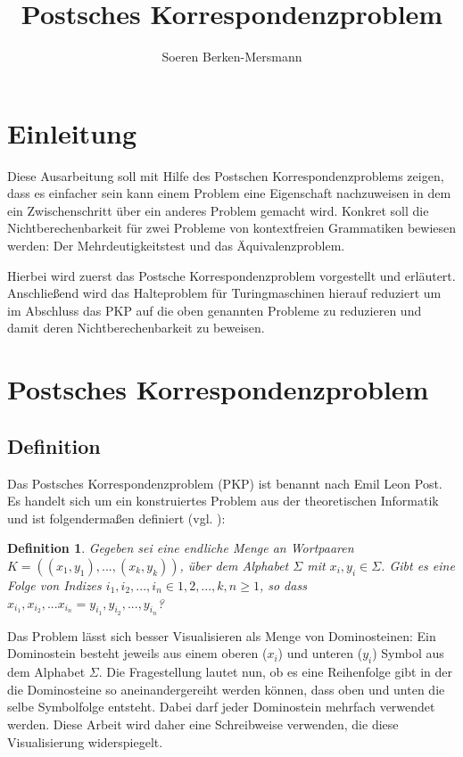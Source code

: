\documentclass[]{scrartcl}
\title{Postsches Korrespondenzproblem}
\author{Soeren Berken-Mersmann}
\newtheorem{definition}{Definition}[section]
\begin{document}
\maketitle

\section{Einleitung}

	Diese Ausarbeitung soll mit Hilfe des Postschen Korrespondenzproblems zeigen, dass es einfacher sein kann einem Problem eine Eigenschaft nachzuweisen in dem ein Zwischenschritt über ein anderes Problem gemacht wird. Konkret soll die Nichtberechenbarkeit für zwei Probleme von kontextfreien Grammatiken bewiesen werden: Der Mehrdeutigkeitstest und das Äquivalenzproblem.
	
	Hierbei wird zuerst das Postsche Korrespondenzproblem vorgestellt und erläutert. Anschließend wird das Halteproblem für Turingmaschinen hierauf reduziert um im Abschluss das PKP auf die oben genannten Probleme zu reduzieren und damit deren Nichtberechenbarkeit zu beweisen.

\section{Postsches Korrespondenzproblem}

	\subsection{Definition}
	
		Das Postsches Korrespondenzproblem (PKP) ist benannt nach Emil Leon Post. Es handelt sich um ein konstruiertes Problem aus der theoretischen Informatik und ist folgendermaßen definiert (vgl. \cite{wegener}):
		
		\begin{definition}
			Gegeben sei eine endliche Menge an Wortpaaren $K = ((x_1, y_1), ..., (x_k, y_k))$, über dem Alphabet $\Sigma$ mit $x_i, y_i \in \Sigma$. Gibt es eine Folge von Indizes $i_1, i_2, ..., i_n \in {1, 2, ..., k}, n \geq 1$, so dass $x_{i_1},x_{i_2}, ... x_{i_n} = y_{i_1}, y_{i_2}, ..., y_{i_n}$?
		\end{definition}
		
		Das Problem lässt sich besser Visualisieren als Menge von Dominosteinen: Ein Dominostein besteht jeweils aus einem oberen ($x_i$) und unteren ($y_i$) Symbol aus dem Alphabet $\Sigma$. Die Fragestellung lautet nun, ob es eine Reihenfolge gibt in der die Dominosteine so aneinandergereiht werden können, dass oben und unten die selbe Symbolfolge entsteht. Dabei darf jeder Dominostein mehrfach verwendet werden. Diese Arbeit wird daher eine Schreibweise verwenden, die diese Visualisierung widerspiegelt.
	
\end{document}
